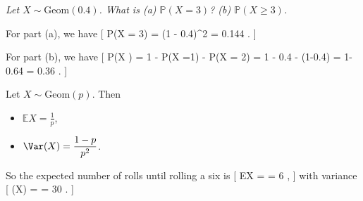 \documentclass[
  letterpaper,
  DIV=11,
  numbers=noendperiod]{scrreprt}
\providecommand{\tightlist}{%
  \setlength{\itemsep}{0pt}\setlength{\parskip}{0pt}}\usepackage{longtable,booktabs,array}
\theoremstyle{remark}
\begin{document}
\emph{Let \(X \sim \mathrm{Geom}(0.4)\). What is (a)
\(\mathbb P(X = 3)\)? (b) \(\mathbb P(X \geq 3)\).}

For part (a), we have {[} \mathbb P(X = 3) = (1 - 0.4)\^{}2  =
0.144 . {]}

For part (b), we have {[} \mathbb P(X ) = 1 - \mathbb P(X =1) -
\mathbb P(X = 2) = 1 - 0.4 - (1-0.4) = 1- 0.64 = 0.36 . {]}

Let \(X \sim \text{Geom}(p)\). Then

\begin{itemize}
\tightlist
\item
  \(\mathbb EX = \displaystyle\frac1p\),
\item
  \(\Var(X) = \displaystyle\frac{1-p}{p^2}\).
\end{itemize}

So the expected number of rolls until rolling a six is {[} \mathbb EX =
 = 6 , {]} with variance {[} \Var(X) =
 = 30 . {]}
\end{document}
